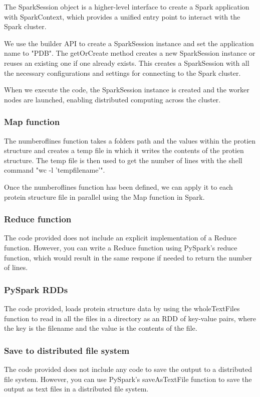 \documentclass[]{final_report}
\begin{document}
The SparkSession object is a higher-level interface to create a Spark application with SparkContext, which provides a unified entry point to interact with the Spark cluster.

We use the builder API to create a SparkSession instance and set the application name to "PDB". The getOrCreate method creates a new SparkSession instance or reuses an existing one if one already exists. This creates a SparkSession with all the necessary configurations and settings for connecting to the Spark cluster.

When we execute the code, the SparkSession instance is created and the worker nodes are launched, enabling distributed computing across the cluster.

\subsubsection{Map function}
The numberoflines function takes a folders path and the values within the protien structure and creates a temp file in which it writes the contents of the protien structure. The temp file is then used to get the number of lines with the shell command "wc -l 'tempfilename'".

Once the numberoflines function has been defined, we can apply it to each protein structure file in parallel using the Map function in Spark.


\subsubsection{Reduce function}
The code provided does not include an explicit implementation of a Reduce function. However, you can write a Reduce function using PySpark's reduce function, which would result in the same respone if needed to return the number of lines.


\subsubsection{PySpark RDDs}
The code provided, loads protein structure data by using the wholeTextFiles function to read in all the files in a directory as an RDD of key-value pairs, where the key is the filename and the value is the contents of the file.

\subsubsection{Save to distributed file system}
The code provided does not include any code to save the output to a distributed file system. However, you can use PySpark's saveAsTextFile function to save the output as text files in a distributed file system.
\clearpage
\end{document}
